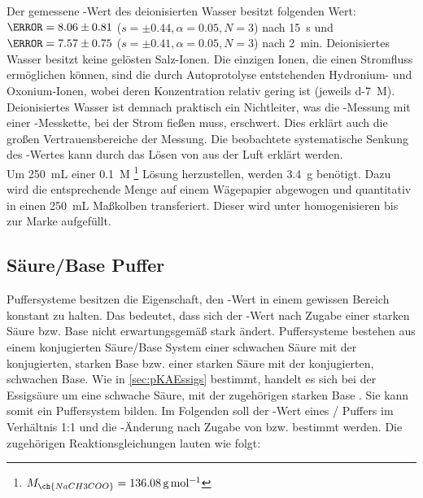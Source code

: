 \documentclass{article}
\begin{document}
         Der gemessene \pH-Wert des deionisierten Wasser besitzt folgenden Wert: $\pH = \num[separate-uncertainty]{8.06 \pm 0.81}$ ($s = \pm 0.44,\alpha = 0.05, N = 3$) nach \SI[mode=text]{15}{\second} und $\pH = \num[separate-uncertainty]{7.57 \pm 0.75}$ ($s = \pm 0.41,\alpha = 0.05, N = 3$) nach \SI[mode=text]{2}{\minute}. Deionisiertes Wasser besitzt keine gelösten Salz-Ionen. Die einzigen Ionen, die einen Stromfluss ermöglichen können, sind die durch Autoprotolyse entstehenden Hydronium- und Oxonium-Ionen, wobei deren Konzentration relativ gering ist (jeweils \SI[mode=text]{d-7}{M}). Deionisiertes Wasser ist demnach praktisch ein Nichtleiter, was die \pH-Messung mit einer \pH-Messkette, bei der Strom fießen muss, erschwert. Dies erklärt auch die großen Vertrauensbereiche der Messung. Die beobachtete systematische Senkung des \pH-Wertes kann durch das Lösen von  aus der Luft erklärt werden. \\
         
         Um \SI[mode=text]{250}{\milli\liter} einer \SI[mode=text]{0.1}{M} \footnote{$M_{\ch{NaCH3COO}} = \SI[mode=text]{136.08}{\gram\per\mole}$} Lösung herzustellen, werden \SI[mode=text]{3.4}{\gram} benötigt. Dazu wird die entsprechende Menge auf einem Wägepapier abgewogen und quantitativ in einen \SI[mode=text]{250}{\milli\liter} Maßkolben transferiert. Dieser wird unter homogenisieren bis zur Marke aufgefüllt. 
    
    \pagebreak
    
    \subsection{Säure/Base Puffer} \label{sec:SauerBase}
    
      Puffersysteme besitzen die Eigenschaft, den \pH-Wert in einem gewissen Bereich konstant zu halten. Das bedeutet, dass sich der \pH-Wert nach Zugabe einer starken Säure bzw. Base nicht erwartungsgemäß stark ändert. Puffersysteme bestehen aus einem konjugierten Säure/Base System einer schwachen Säure mit der konjugierten, starken Base bzw. einer starken Säure mit der konjugierten, schwachen Base. Wie in \ref{sec:pKAEssigs} bestimmt, handelt es sich bei der Essigsäure um eine schwache Säure, mit der zugehörigen starken Base . Sie kann somit ein Puffersystem bilden. Im Folgenden soll der \pH-Wert eines / Puffers im Verhältnis 1:1 und die \pH-Änderung nach Zugabe von  bzw.  bestimmt werden. Die zugehörigen Reaktionsgleichungen lauten wie folgt:
      
\end{document}
